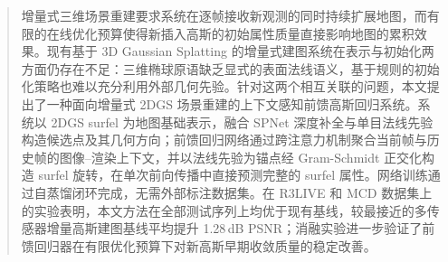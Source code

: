 
\begin{abstract}

增量式三维场景重建要求系统在逐帧接收新观测的同时持续扩展地图，而有限的在线优化预算使得新插入高斯的初始属性质量直接影响地图的累积效果。现有基于 3D Gaussian Splatting 的增量式建图系统在表示与初始化两方面仍存在不足：三维椭球原语缺乏显式的表面法线语义，基于规则的初始化策略也难以充分利用外部几何先验。针对这两个相互关联的问题，本文提出了一种面向增量式 2DGS 场景重建的上下文感知前馈高斯回归系统。系统以 2DGS surfel 为地图基础表示，融合 SPNet 深度补全与单目法线先验构造候选点及其几何方向；前馈回归网络通过跨注意力机制聚合当前帧与历史帧的图像--渲染上下文，并以法线先验为锚点经 Gram-Schmidt 正交化构造 surfel 旋转，在单次前向传播中直接预测完整的 surfel 属性。网络训练通过自蒸馏闭环完成，无需外部标注数据集。在 R3LIVE 和 MCD 数据集上的实验表明，本文方法在全部测试序列上均优于现有基线，较最接近的多传感器增量高斯建图基线平均提升 1.28\,dB PSNR；消融实验进一步验证了前馈回归器在有限优化预算下对新高斯早期收敛质量的稳定改善。

\end{abstract}
